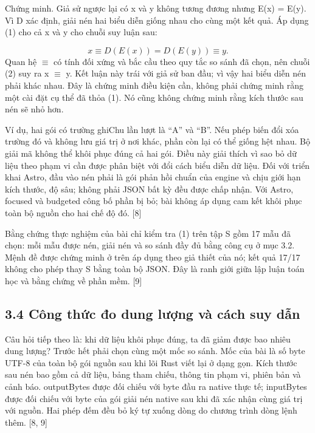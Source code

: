 \documentclass[11pt,a4paper]{article}
\begin{document}
Chứng minh. Giả sử ngược lại có x và y không tương đương nhưng E(x) = E(y). Vì D xác định, giải nén hai biểu diễn giống nhau cho cùng một kết quả. Áp dụng (1) cho cả x và y cho chuỗi suy luận sau:


\begin{equation}x\equiv D(E(x))=D(E(y))\equiv y.\label{eq:INJECTIVE}\end{equation}
Quan hệ \(\equiv\) có tính đối xứng và bắc cầu theo quy tắc so sánh đã chọn, nên chuỗi (2) suy ra x \(\equiv\) y. Kết luận này trái với giả sử ban đầu; vì vậy hai biểu diễn nén phải khác nhau. Đây là chứng minh điều kiện cần, không phải chứng minh rằng một cài đặt cụ thể đã thỏa (1). Nó cũng không chứng minh rằng kích thước sau nén sẽ nhỏ hơn.


Ví dụ, hai gói có trường ghiChu lần lượt là “A” và “B”. Nếu phép biến đổi xóa trường đó và không lưu giá trị ở nơi khác, phần còn lại có thể giống hệt nhau. Bộ giải mã không thể khôi phục đúng cả hai gói. Điều này giải thích vì sao bỏ dữ liệu theo phạm vi cần được phân biệt với đổi cách biểu diễn dữ liệu. Đối với triển khai Astro, đầu vào nén phải là gói phản hồi chuẩn của engine và chịu giới hạn kích thước, độ sâu; không phải JSON bất kỳ đều được chấp nhận. Với Astro, focused và budgeted công bố phần bị bỏ; bài không áp dụng cam kết khôi phục toàn bộ nguồn cho hai chế độ đó. [8]


Bằng chứng thực nghiệm của bài chỉ kiểm tra (1) trên tập S gồm 17 mẫu đã chọn: mỗi mẫu được nén, giải nén và so sánh đầy đủ bằng công cụ ở mục 3.2. Mệnh đề được chứng minh ở trên áp dụng theo giả thiết của nó; kết quả 17/\allowbreak{}17 không cho phép thay S bằng toàn bộ JSON. Đây là ranh giới giữa lập luận toán học và bằng chứng về phần mềm. [9]


\subsection*{3.4 Công thức đo dung lượng và cách suy dẫn}
Câu hỏi tiếp theo là: khi dữ liệu khôi phục đúng, ta đã giảm được bao nhiêu dung lượng? Trước hết phải chọn cùng một mốc so sánh. Mốc của bài là số byte UTF-8 của toàn bộ gói nguồn sau khi lõi Rust viết lại ở dạng gọn. Kích thước sau nén bao gồm cả dữ liệu, bảng tham chiếu, thông tin phạm vi, phiên bản và cảnh báo. outputBytes được đối chiếu với byte đầu ra native thực tế; inputBytes được đối chiếu với byte của gói giải nén native sau khi đã xác nhận cùng giá trị với nguồn. Hai phép đếm đều bỏ ký tự xuống dòng do chương trình dòng lệnh thêm. [8, 9]
\end{document}
